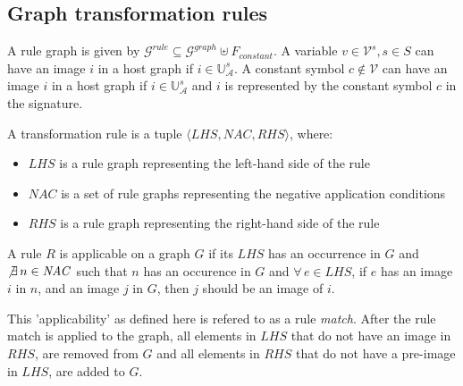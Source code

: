 \subsection{Graph transformation rules}\label{sec:graph_rules}
A rule graph is given by $\mathcal{G}^{rule} \subseteq \mathcal{G}^{graph} \uplus F_{constant}$. A variable $v \in \mathcal{V}^{s}, s \in S$ can have an image $i$ in a host graph if $i \in \mathbb{U}_\mathcal{A}^{s}$. A constant symbol $c \notin \mathcal{V}$ can have an image $i$ in a host graph if $i \in \mathbb{U}_\mathcal{A}^{s}$ and $i$ is represented by the constant symbol $c$ in the signature.
\vspace{5px}
\begin{definition}
A transformation rule is a tuple $\langle \mathit{LHS}, \mathit{NAC}, \mathit{RHS}\rangle$, where:
\begin{itemize}
  \item $\mathit{LHS}$ is a rule graph representing the left-hand side of the rule
  \item $\mathit{NAC}$ is a set of rule graphs representing the negative application conditions
  \item $\mathit{RHS}$ is a rule graph representing the right-hand side of the rule
\end{itemize}
\end{definition}

\begin{comment}\begin{definition}
$\mathit{LHS}$ is a tuple $\langle \mathcal{V}_{LHS}, \mathcal{E}_{LHS}, \mathcal{O}_{LHS} \rangle$, where $\mathcal{O}_{LHS} \subseteq \mathcal{V}^n \times O_p \times \mathcal{V}$.
\end{definition}\end{comment}

A rule $R$ is applicable on a graph $G$ if its $\mathit{LHS}$ has an occurrence in $G$ and $\not\exists\,n \in \mathit{NAC}$ such that $n$ has an occurence in $G$ and $\forall\,e \in \mathit{LHS}$, if $e$ has an image $i$ in $n$, and an image $j$ in $G$, then $j$ should be an image of $i$.

This 'applicability' as defined here is refered to as a rule \textit{match}. After the rule match is applied to the graph, all elements in $\mathit{LHS}$ that do not have an image in $\mathit{RHS}$, are removed from $G$ and all elements in $\mathit{RHS}$ that do not have a pre-image in $\mathit{LHS}$, are added to $G$.

